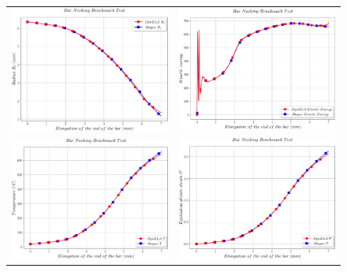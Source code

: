 \begin{figure}[h]
\begin{centering}
\begin{tabular}{cc}
\includegraphics[width=0.45\columnwidth]{Figures/Samples/Plasticity/BarNecking_radius} & \includegraphics[width=0.45\columnwidth]{Figures/Samples/Plasticity/BarNecking_kineticEnergy}\tabularnewline
\includegraphics[width=0.45\columnwidth]{Figures/Samples/Plasticity/BarNecking_temperature} & \includegraphics[width=0.45\columnwidth]{Figures/Samples/Plasticity/BarNecking_plasticStrain}\tabularnewline

\end{tabular}
\end{centering}
\end{figure}
